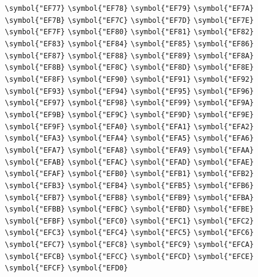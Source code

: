 \documentclass{ctexbook}
\begin{document}
{\verb|\symbol{"EF77}|  \verb|\symbol{"EF78}|  \verb|\symbol{"EF79}|  \verb|\symbol{"EF7A}|  \verb|\symbol{"EF7B}|  \verb|\symbol{"EF7C}|  \verb|\symbol{"EF7D}|  \verb|\symbol{"EF7E}|  \verb|\symbol{"EF7F}|  \verb|\symbol{"EF80}|  \verb|\symbol{"EF81}|  \verb|\symbol{"EF82}|  \verb|\symbol{"EF83}|  \verb|\symbol{"EF84}|  \verb|\symbol{"EF85}|  \verb|\symbol{"EF86}|  \verb|\symbol{"EF87}|  \verb|\symbol{"EF88}|  \verb|\symbol{"EF89}|  \verb|\symbol{"EF8A}|  \verb|\symbol{"EF8B}|  \verb|\symbol{"EF8C}|  \verb|\symbol{"EF8D}|  \verb|\symbol{"EF8E}|  \verb|\symbol{"EF8F}|  \verb|\symbol{"EF90}|  \verb|\symbol{"EF91}|  \verb|\symbol{"EF92}|  \verb|\symbol{"EF93}|  \verb|\symbol{"EF94}|  \verb|\symbol{"EF95}|  \verb|\symbol{"EF96}|  \verb|\symbol{"EF97}|  \verb|\symbol{"EF98}|  \verb|\symbol{"EF99}|  \verb|\symbol{"EF9A}|  \verb|\symbol{"EF9B}|  \verb|\symbol{"EF9C}|  \verb|\symbol{"EF9D}|  \verb|\symbol{"EF9E}|  \verb|\symbol{"EF9F}|  \verb|\symbol{"EFA0}|  \verb|\symbol{"EFA1}|  \verb|\symbol{"EFA2}|  \verb|\symbol{"EFA3}|  \verb|\symbol{"EFA4}|  \verb|\symbol{"EFA5}|  \verb|\symbol{"EFA6}|  \verb|\symbol{"EFA7}|  \verb|\symbol{"EFA8}|  \verb|\symbol{"EFA9}|  \verb|\symbol{"EFAA}|  \verb|\symbol{"EFAB}|  \verb|\symbol{"EFAC}|  \verb|\symbol{"EFAD}|  \verb|\symbol{"EFAE}|  \verb|\symbol{"EFAF}|  \verb|\symbol{"EFB0}|  \verb|\symbol{"EFB1}|  \verb|\symbol{"EFB2}|  \verb|\symbol{"EFB3}|  \verb|\symbol{"EFB4}|  \verb|\symbol{"EFB5}|  \verb|\symbol{"EFB6}|  \verb|\symbol{"EFB7}|  \verb|\symbol{"EFB8}|  \verb|\symbol{"EFB9}|  \verb|\symbol{"EFBA}|  \verb|\symbol{"EFBB}|  \verb|\symbol{"EFBC}|  \verb|\symbol{"EFBD}|  \verb|\symbol{"EFBE}|  \verb|\symbol{"EFBF}|  \verb|\symbol{"EFC0}|  \verb|\symbol{"EFC1}|  \verb|\symbol{"EFC2}|  \verb|\symbol{"EFC3}|  \verb|\symbol{"EFC4}|  \verb|\symbol{"EFC5}|  \verb|\symbol{"EFC6}|  \verb|\symbol{"EFC7}|  \verb|\symbol{"EFC8}|  \verb|\symbol{"EFC9}|  \verb|\symbol{"EFCA}|  \verb|\symbol{"EFCB}|  \verb|\symbol{"EFCC}|  \verb|\symbol{"EFCD}|  \verb|\symbol{"EFCE}|  \verb|\symbol{"EFCF}|  \verb|\symbol{"EFD0}|  }
\end{document}
